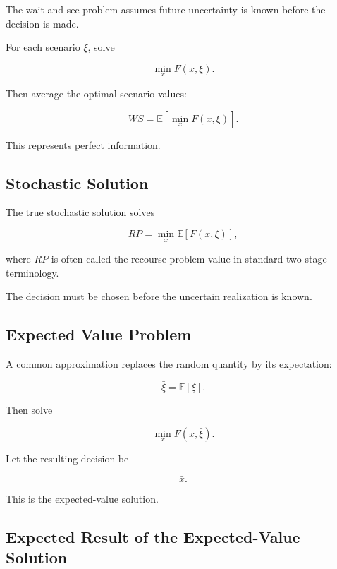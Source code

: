 The wait-and-see problem assumes future uncertainty is known before the
decision is made.

For each scenario \(\xi\), solve

\[
\boxed{
\min_x
F(x,\xi).
}
\]

Then average the optimal scenario values:

\[
\boxed{
WS
=
\mathbb{E}
\left[
\min_x
F(x,\xi)
\right].
}
\]

This represents perfect information.

\subsection{Stochastic Solution}
\label{subsec:stochastic-solution}

The true stochastic solution solves

\[
\boxed{
RP
=
\min_x
\mathbb{E}
[
F(x,\xi)
],
}
\]

where \(RP\) is often called the recourse problem value in standard
two-stage terminology.

The decision must be chosen before the uncertain realization is known.

\subsection{Expected Value Problem}
\label{subsec:expected-value-problem}

A common approximation replaces the random quantity by its expectation:

\[
\boxed{
\bar{\xi}
=
\mathbb{E}[\xi].
}
\]

Then solve

\[
\boxed{
\min_x
F(x,\bar{\xi}).
}
\]

Let the resulting decision be

\[
\bar{x}.
\]

This is the expected-value solution.

\subsection{Expected Result of the Expected-Value Solution}
\label{subsec:eev}


